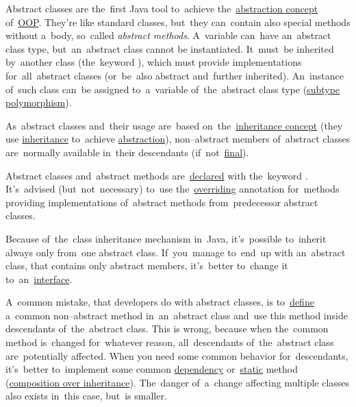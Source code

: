 \label{javaabstractclasses}
Abstract classes are the~first Java tool to~achieve the~\hyperref[abstraction]{abstraction concept} of~\hyperref[objectorientedprogramming]{OOP}.
They're like standard classes, but~they can~contain also special methods without a~body, so~called \textit{abstract methods}.
A~variable can~have an~abstract class type, but~an~abstract class cannot be instantiated.
It~must~be inherited by~another class (the~keyword ), which must provide implementations for~all~abstract classes (or~be~also abstract and~further inherited).
An~instance of~such class can~be assigned to~a~variable of~the~abstract class type (\hyperref[polymorphism]{subtype polymorphism}).

As~abstract classes and~their usage are~based on~the~\hyperref[inheritance]{inheritance concept} (they use \hyperref[inheritance]{inheritance} to~achieve \hyperref[abstraction]{abstraction}), \mbox{non--abstract} members of~abstract classes are~normally available in~their descendants (if~not~\hyperref[javafinal]{final}).

Abstract classes and~abstract methods are~\hyperref[declarationdefinition]{declared} with the~keyword .
It's~advised (but~not~necessary) to~use the~\hyperref[javaoverride]{overriding} annotation for~methods providing implementations of~abstract methods from~predecessor abstract classes.

Because of~the~class inheritance mechanism in~Java, it's~possible to~inherit always only from~one abstract class.
If~you~manage to~end~up with an~abstract class, that contains only abstract members, it's~better to~change it to~an~\hyperref[javainterfaces]{interface}.

A~common mistake, that developers do with abstract classes, is to~\hyperref[declarationdefinition]{define} a~common \mbox{non--abstract} method in~an~abstract class and~use this method inside descendants of~the~abstract class.
This is wrong, because when the~common method is~changed for~whatever reason, all~descendants of~the~abstract class are~potentially affected.
When you need some common behavior for~descendants, it's~better to~implement some common \hyperref[dependencyinjection]{dependency} or~\hyperref[javastatic]{static} method (\hyperref[compositionoverinheritance]{composition over inheritance}).
The~danger of~a~change affecting multiple classes also exists in~this case, but~is smaller.

